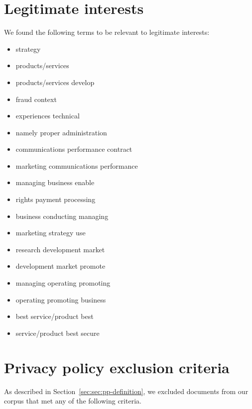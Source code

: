 {\section{Legitimate interests}\label{apd:legitimateinterests}
We found the following terms to be relevant to legitimate interests:
\begin{itemize}
    \item strategy
    \item products/services
    \item products/services develop
    \item fraud context
    \item experiences technical
    \item namely proper administration
    \item communications performance contract
    \item marketing communications performance
    \item managing business enable
    \item rights payment processing
    \item business conducting managing
    \item marketing strategy use
    \item research development market
    \item development market promote
    \item managing operating promoting
    \item operating promoting business
    \item best service/product best
    \item service/product best secure
\end{itemize}

\fi
}
\section{Privacy policy exclusion criteria}
\label{sec:labeling-criteria}

As described in Section~\ref{sec:sec:pp-definition}, we excluded documents from our corpus that met any of the following criteria.

